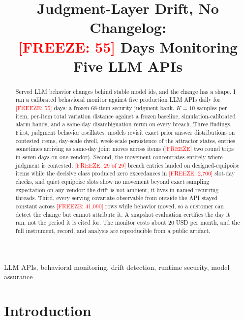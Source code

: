 \documentclass[conference]{IEEEtran}
\newcommand{\freeze}[1]{\textcolor{red}{[FREEZE: #1]}}
\newcommand{\freezebare}{\textcolor{red}{[FREEZE]}}
\newif\ifanonymous
\begin{document}
\title{Judgment-Layer Drift, No Changelog:\\
\freeze{55} Days Monitoring Five LLM APIs}

\ifanonymous
\author{\IEEEauthorblockN{Anonymous submission}
\IEEEauthorblockA{INTERCEPT Defenders track}}
\else
\author{
}
\fi

\maketitle

\begin{abstract}
Served LLM behavior changes behind stable model ids, and the change
has a shape. I ran a calibrated behavioral monitor against five
production LLM APIs daily for \freeze{55} days: a frozen 68-item
security judgment bank, $K=10$ samples per item, per-item total
variation distance against a frozen baseline, simulation-calibrated
alarm bands, and a same-day disambiguation rerun on every breach.
Three findings. First, judgment behavior oscillates: models revisit
exact prior answer distributions on contested items, day-scale
dwell, week-scale persistence of the attractor states, entries
sometimes arriving as same-day joint moves across items
(\freezebare{} two round trips in seven days on one vendor). Second,
the movement concentrates entirely where judgment is contested:
\freeze{29 of 29} breach entries landed on designed-equipoise items
while the decisive class produced zero exceedances in \freeze{2,700}
slot-day checks, and quiet equipoise slots show no movement beyond
exact sampling expectation on any vendor: the drift is not ambient,
it lives in named recurring threads. Third, every serving covariate
observable from outside the API stayed constant across
\freeze{41,090} rows while behavior moved, so a customer can detect
the change but cannot attribute it. A snapshot evaluation certifies
the day it ran, not the period it is cited for. The monitor costs
about 20 USD per month, and the full instrument, record, and
analysis are reproducible from a public artifact.
\end{abstract}

\begin{IEEEkeywords}
LLM APIs, behavioral monitoring, drift detection, runtime security,
model assurance
\end{IEEEkeywords}

\section{Introduction}
\end{document}
